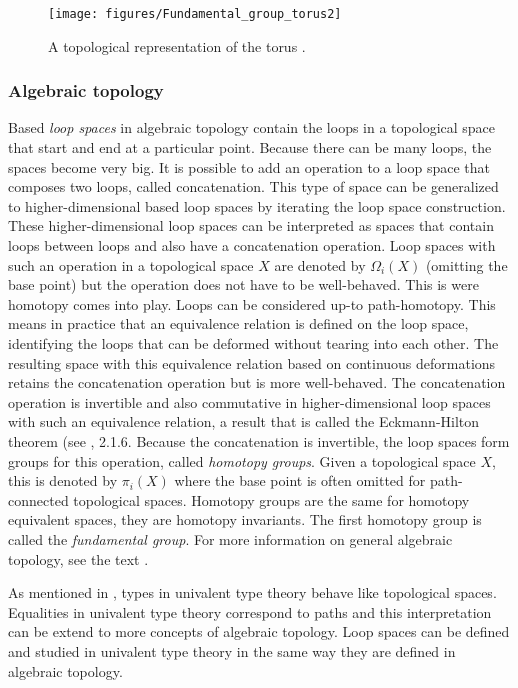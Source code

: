 \documentclass[12pt,a4paper,twoside,xetex]{book} %
\newcommand{\keyword}[1]{\emph{#1}\index{#1}}
\begin{document}
\begin{figure}
\centering
\texttt{[image: figures/Fundamental\_group\_torus2]}
\caption{A topological representation of the torus \cite{Dinkelbach2005}. 
\label{torus}}
\end{figure}

\subsubsection{Algebraic topology}\label{higherhomotopy}

Based \keyword{loop spaces} in algebraic topology contain the loops in a topological space that start and end at a particular point. Because there can be many loops, the spaces become very big. It is possible to add an operation to a loop space that composes two loops, called concatenation. This type of space can be generalized to higher-dimensional based loop spaces by iterating the loop space construction. These higher-dimensional loop spaces can be interpreted as spaces that contain loops between loops and also have a concatenation operation. Loop spaces with such an operation in a topological space $X$ are denoted by $\Omega_i (X)$ (omitting the base point) but the operation does not have to be well-behaved. This is were homotopy comes into play. Loops can be considered up-to path-homotopy. This means in practice that an equivalence relation is defined on the loop space, identifying the loops that can be deformed without tearing into each other. The resulting space with this equivalence relation based on continuous deformations retains the concatenation operation but is more well-behaved. The concatenation operation is invertible and also commutative in higher-dimensional loop spaces with such an equivalence relation, a result that is called the Eckmann-Hilton theorem (see \cite{Voevodsky2013}, 2.1.6. Because the concatenation is invertible, the loop spaces form groups for this operation, called \keyword{homotopy groups}. Given a topological space $X$, this is denoted by $\pi_i(X)$ where the base point is often omitted for path-connected topological spaces. Homotopy groups are the same for homotopy equivalent spaces, they are homotopy invariants. The first homotopy group is called the \keyword{fundamental group}. For more information on general 
algebraic topology, see the text \cite{Hatcher2001}.


As mentioned in , types in univalent type theory behave like topological spaces. Equalities in univalent type theory correspond to paths and this interpretation can be extend to more concepts of algebraic topology. Loop spaces can be defined and studied in univalent type theory in the same way they are defined in algebraic topology. 
\end{document}

